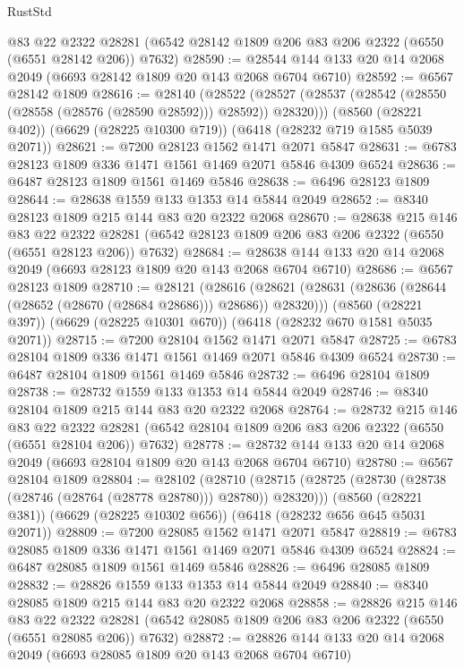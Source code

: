 \begin{lexlean}{RustStd}
\begin{coremodule}
    @83
    @22
    @2322
    @28281
    (@6542 @28142 @1809 @206 @83 @206 @2322 (@6550 (@6551 @28142 @206)) @7632)
@28590 := @28544 @144 @133 @20 @14 @2068 @2049 (@6693 @28142 @1809 @20 @143 @2068 @6704 @6710)
@28592 := @6567 @28142 @1809
@28616 := @28140
    (@28522 (@28527 (@28537 (@28542 (@28550 (@28558 (@28576 (@28590 @28592))) @28592)) @28320)))
    (@8560 (@28221 @402))
    (@6629 (@28225 @10300 @719))
    (@6418 (@28232 @719 @1585 @5039 @2071))
@28621 := @7200 @28123 @1562 @1471 @2071 @5847
@28631 := @6783 @28123 @1809 @336 @1471 @1561 @1469 @2071 @5846 @4309 @6524
@28636 := @6487 @28123 @1809 @1561 @1469 @5846
@28638 := @6496 @28123 @1809
@28644 := @28638 @1559 @133 @1353 @14 @5844 @2049
@28652 := @8340 @28123 @1809 @215 @144 @83 @20 @2322 @2068
@28670 := @28638
    @215
    @146
    @83
    @22
    @2322
    @28281
    (@6542 @28123 @1809 @206 @83 @206 @2322 (@6550 (@6551 @28123 @206)) @7632)
@28684 := @28638 @144 @133 @20 @14 @2068 @2049 (@6693 @28123 @1809 @20 @143 @2068 @6704 @6710)
@28686 := @6567 @28123 @1809
@28710 := @28121
    (@28616 (@28621 (@28631 (@28636 (@28644 (@28652 (@28670 (@28684 @28686))) @28686)) @28320)))
    (@8560 (@28221 @397))
    (@6629 (@28225 @10301 @670))
    (@6418 (@28232 @670 @1581 @5035 @2071))
@28715 := @7200 @28104 @1562 @1471 @2071 @5847
@28725 := @6783 @28104 @1809 @336 @1471 @1561 @1469 @2071 @5846 @4309 @6524
@28730 := @6487 @28104 @1809 @1561 @1469 @5846
@28732 := @6496 @28104 @1809
@28738 := @28732 @1559 @133 @1353 @14 @5844 @2049
@28746 := @8340 @28104 @1809 @215 @144 @83 @20 @2322 @2068
@28764 := @28732
    @215
    @146
    @83
    @22
    @2322
    @28281
    (@6542 @28104 @1809 @206 @83 @206 @2322 (@6550 (@6551 @28104 @206)) @7632)
@28778 := @28732 @144 @133 @20 @14 @2068 @2049 (@6693 @28104 @1809 @20 @143 @2068 @6704 @6710)
@28780 := @6567 @28104 @1809
@28804 := @28102
    (@28710 (@28715 (@28725 (@28730 (@28738 (@28746 (@28764 (@28778 @28780))) @28780)) @28320)))
    (@8560 (@28221 @381))
    (@6629 (@28225 @10302 @656))
    (@6418 (@28232 @656 @645 @5031 @2071))
@28809 := @7200 @28085 @1562 @1471 @2071 @5847
@28819 := @6783 @28085 @1809 @336 @1471 @1561 @1469 @2071 @5846 @4309 @6524
@28824 := @6487 @28085 @1809 @1561 @1469 @5846
@28826 := @6496 @28085 @1809
@28832 := @28826 @1559 @133 @1353 @14 @5844 @2049
@28840 := @8340 @28085 @1809 @215 @144 @83 @20 @2322 @2068
@28858 := @28826
    @215
    @146
    @83
    @22
    @2322
    @28281
    (@6542 @28085 @1809 @206 @83 @206 @2322 (@6550 (@6551 @28085 @206)) @7632)
@28872 := @28826 @144 @133 @20 @14 @2068 @2049 (@6693 @28085 @1809 @20 @143 @2068 @6704 @6710)

\end{coremodule}
\end{lexlean}
